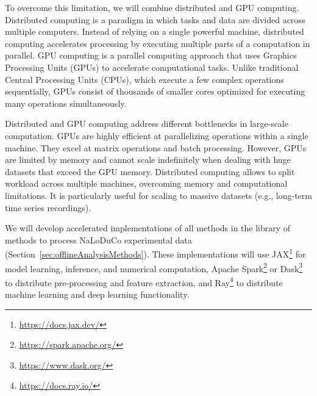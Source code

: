 To overcome this limitation, we will combine distributed and GPU computing.
%
Distributed computing is a paradigm
in which tasks and data are divided across multiple computers. Instead of
relying on a single powerful machine, distributed computing accelerates
processing by executing multiple parts of a computation in parallel.
%
GPU computing is a parallel computing approach that uses Graphics Processing
Units (GPUs) to accelerate computational tasks. Unlike traditional Central
Processing Units (CPUs), which execute a few complex operations sequentially,
GPUs consist of thousands of smaller cores optimized for executing many
operations simultaneously.

Distributed and GPU computing address different bottlenecks in large-scale
computation. GPUs are highly efficient at parallelizing operations within a
single machine. They excel at matrix operations and batch processing. However,
GPUs are limited by memory and cannot scale indefinitely when dealing with huge
datasets that exceed the GPU memory.
%
Distributed computing allows to split workload across multiple machines,
overcoming memory and computational limitations. It is particularly useful for
scaling to massive datasets (e.g., long-term time series recordings).

\begin{comment}

For distributed computing to deliver substantial speed improvements,
computations must be decomposable into independent parallel tasks. Due to their
serial dependencies, time series models are difficult to decomposed in this
manner.
%
Still, time series models can benefit from distributed computing
infrastructures.

While not
all algorithms naturally support such decomposition, in machine learning
distributed computing remains valuable even for non-parallelizable algorithms.
For instance, it enables efficient hyperparameter optimization, where multiple
algorithm configurations can be tested in parallel, significantly reducing
overall runtime.



\end{comment}

We will develop accelerated implementations of all methods in the library of
methods to process NaLoDuCo experimental data
(Section~\ref{sec:offlineAnalysisMethods}). These implementations will use
JAX\footnote{\url{https://docs.jax.dev/}} for model learning, inference, and numerical computation, Apache
Spark\footnote{\url{https://spark.apache.org/}} or
Dask\footnote{\url{https://www.dask.org/}} to distribute pre-processing and
feature extraction, and Ray\footnote{\url{https://docs.ray.io/}} to distribute
machine learning and deep learning functionality.

